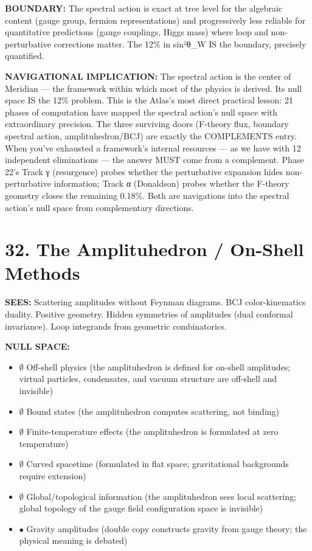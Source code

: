 \textbf{BOUNDARY:} The spectral action is exact at tree level for the algebraic content (gauge group, fermion representations) and progressively less reliable for quantitative predictions (gauge couplings, Higgs mass) where loop and non-perturbative corrections matter. The 12\% in sin²θ\_W IS the boundary, precisely quantified.


\textbf{NAVIGATIONAL IMPLICATION:} The spectral action is the center of Meridian — the framework within which most of the physics is derived. Its null space IS the 12\% problem. This is the Atlas's most direct practical lesson: 21 phases of computation have mapped the spectral action's null space with extraordinary precision. The three surviving doors (F-theory flux, boundary spectral action, amplituhedron/BCJ) are exactly the COMPLEMENTS entry. When you've exhausted a framework's internal resources — as we have with 12 independent eliminations — the answer MUST come from a complement. Phase 22's Track γ (resurgence) probes whether the perturbative expansion hides non-perturbative information; Track α (Donaldson) probes whether the F-theory geometry closes the remaining 0.18\%. Both are navigations into the spectral action's null space from complementary directions.


\bigskip\noindent\makebox[\textwidth]{\color{rulegray}\rule{5cm}{0.3pt}}\bigskip


\section*{32. The Amplituhedron / On-Shell Methods}


\textbf{SEES:} Scattering amplitudes without Feynman diagrams. BCJ color-kinematics duality. Positive geometry. Hidden symmetries of amplitudes (dual conformal invariance). Loop integrands from geometric combinatorics.


\textbf{NULL SPACE:}

\begin{itemize}[nosep,leftmargin=*]
  \item $\emptyset$ Off-shell physics (the amplituhedron is defined for on-shell amplitudes; virtual particles, condensates, and vacuum structure are off-shell and invisible)
  \item $\emptyset$ Bound states (the amplituhedron computes scattering, not binding)
  \item $\emptyset$ Finite-temperature effects (the amplituhedron is formulated at zero temperature)
  \item $\emptyset$ Curved spacetime (formulated in flat space; gravitational backgrounds require extension)
  \item $\emptyset$ Global/topological information (the amplituhedron sees local scattering; global topology of the gauge field configuration space is invisible)
  \item $\bullet$ Gravity amplitudes (double copy constructs gravity from gauge theory; the physical meaning is debated)
\end{itemize}


